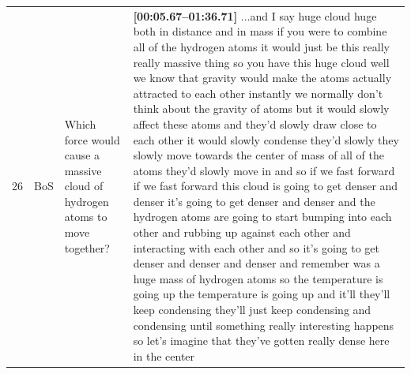 \documentclass[10pt]{article}
\begin{document}
\begin{tiny}
\begin{longtable}{|r|p{0.375in}|p{1.275in}|p{3.5in}|}
26 &          BoS &                                                                                                                                                                                                      Which force would cause a massive cloud of hydrogen atoms to move together? &                                                                                                                                                                                                                                                                                                                                                                                                                                                                                                                                                                                                                                                                                                                                                                                                                                                                                                                                                                                                                                                                                                                                                                                                                                                                                                                                                                                                                                                                                                                                                                                                                                                                                                                                                                                                                                                                        \textbf{[00:05.67--01:36.71]} ...and I say huge cloud huge both in distance and in mass if you were to combine all of the hydrogen atoms it would just be this really really massive thing so you have this huge cloud well we know that gravity would make the atoms actually attracted to each other instantly we normally don't think about the gravity of atoms but it would slowly affect these atoms and they'd slowly draw close to each other it would slowly condense they'd slowly they slowly move towards the center of mass of all of the atoms they'd slowly move in and so if we fast forward if we fast forward this cloud is going to get denser and denser it's going to get denser and denser and the hydrogen atoms are going to start bumping into each other and rubbing up against each other and interacting with each other and so it's going to get denser and denser and denser and remember was a huge mass of hydrogen atoms so the temperature is going up the temperature is going up and it'll they'll keep condensing they'll just keep condensing and condensing until something really interesting happens so let's imagine that they've gotten really dense here in the center 
\end{longtable}
\end{tiny}
\end{document}
